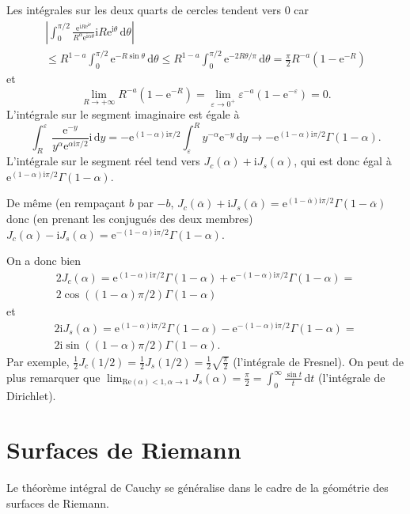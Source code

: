 \documentclass{aomart}
\begin{document}
Les intégrales sur les deux quarts de cercles tendent vers $0$ car
\begin{multline*}
\left|\int _{0}^{\pi /2}{\frac {{\mathrm {e} }^{\mathrm {i} R\mathrm
        {e} ^{\mathrm {i} \theta }}}{R^{\alpha }\mathrm {e} ^{\mathrm
        {i} \alpha \theta }}}\mathrm {i} R\mathrm {e} ^{\mathrm {i}
    \theta }\,\mathrm {d} \theta \right| \\
\leq R^{1-a}\int _{0}^{\pi
  /2}{\mathrm {e} }^{-R\sin \theta }\,\mathrm {d} \theta \leq
R^{1-a}\int _{0}^{\pi /2}{\mathrm {e} }^{-2R\theta /\pi }\,\mathrm {d}
\theta ={\frac {\pi }{2}}R^{-a}(1-\mathrm {e} ^{-R})
\end{multline*}
et
\begin{displaymath}
\lim _{R\to +\infty }R^{-a}(1-\mathrm {e} ^{-R})=\lim _{\varepsilon
  \to 0^{+}}\varepsilon ^{-a}(1-\mathrm {e} ^{-\varepsilon })=0.
\end{displaymath}
L'intégrale sur le segment imaginaire est égale à
\begin{displaymath}
\int _{R}^{\varepsilon }{\frac {{\mathrm {e} }^{-y}}{y^{\alpha
    }\mathrm {e} ^{\alpha \mathrm {i} \pi /2}}}\mathrm {i} \,\mathrm
{d} y=-\mathrm {e} ^{(1-\alpha )\mathrm {i} \pi /2}\int _{\varepsilon
}^{R}y^{-\alpha }\mathrm {e} ^{-y}\,\mathrm {d} y\to -\mathrm {e}
^{(1-\alpha )\mathrm {i} \pi /2}\Gamma (1-\alpha ).
\end{displaymath}
L'intégrale sur le segment réel tend vers
$J_{c}(\alpha )+\mathrm {i} J_{s}(\alpha )$, qui est donc égal à
$\mathrm {e} ^{(1-\alpha )\mathrm {i} \pi /2}\Gamma (1-\alpha )$.

De même (en rempaçant $b$ par $-b$,
$J_{c}({\overline {\alpha }})+\mathrm {i} J_{s}({\overline {\alpha
  }})=\mathrm {e} ^{(1-{\overline {\alpha }})\mathrm {i} \pi /2}\Gamma
(1-{\overline {\alpha }})$ donc (en prenant les conjugués des deux
membres) $J_{c}(\alpha )-\mathrm {i} J_{s}(\alpha
)=\mathrm {e} ^{-(1-\alpha )\mathrm {i} \pi /2}\Gamma (1-\alpha )$.

On a donc bien
\begin{multline*}
2J_{c}(\alpha )=\mathrm {e} ^{(1-\alpha )\mathrm {i} \pi /2}\Gamma
(1-\alpha )+\mathrm {e} ^{-(1-\alpha )\mathrm {i} \pi /2}\Gamma
(1-\alpha )=\\
2\cos((1-\alpha )\pi /2)\Gamma (1-\alpha )
\end{multline*}
et
\begin{multline*}
2\mathrm {i} J_{s}(\alpha )=\mathrm {e} ^{(1-\alpha )\mathrm {i} \pi
  /2}\Gamma (1-\alpha )-\mathrm {e} ^{-(1-\alpha )\mathrm {i} \pi
  /2}\Gamma (1-\alpha )=\\
2\mathrm {i} \sin((1-\alpha )\pi /2)\Gamma
(1-\alpha ).
\end{multline*}
Par exemple,
$\frac {1}{2}J_{c}(1/2)={\frac {1}{2}}J_{s}(1/2)={\frac {1}{2}}{\sqrt
{\frac {\pi }{2}}}$ (l'intégrale de Fresnel). On peut de plus
remarquer que
$\lim _{\mathrm {Re} (\alpha )<1,\alpha \to 1}J_{s}(\alpha )={\frac
  {\pi }{2}}=\int _{0}^{\infty }{\frac {\sin t}{t}}\,\mathrm {d} t$
(l'intégrale de Dirichlet).

\section{Surfaces de Riemann}

Le théorème intégral de Cauchy se généralise dans le cadre de la
géométrie des surfaces de Riemann.



\end{document}
